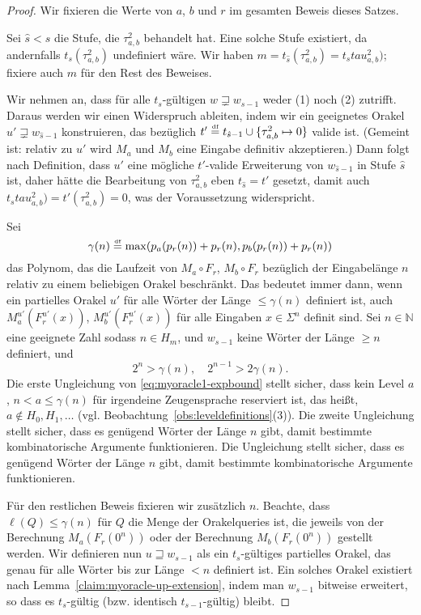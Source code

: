 \begin{proof}
Wir fixieren die Werte von $a$, $b$ und $r$ im gesamten Beweis dieses Satzes.

Sei $\hat{s} < s$ die Stufe, die $\tau^2_{a,b}$ behandelt hat.
Eine solche Stufe existiert, da andernfalls $t_{s}(\tau^2_{a,b})$ undefiniert wäre.
Wir haben $m = t_{\hat{s}}(\tau^2_{a,b}) = t_{s}tau^2_{a,b})$; fixiere auch $m$ für den Rest des Beweises.

Wir nehmen an, dass für alle $t_{s}$-gültigen $w\sqsupsetneq w_{s-1}$ weder (1) noch (2) zutrifft.
Daraus werden wir einen Widerspruch ableiten, indem wir ein geeignetes Orakel $u'\sqsupsetneq w_{\hat{s}-1}$ konstruieren, das bezüglich $t' \stackrel{\text{\smash{\tiny df}}}{=}  t_{\hat{s}-1}\cup \{\tau^2_{a,b}\mapsto 0\}$ valide ist. (Gemeint ist: relativ zu $u'$ wird $M_a$ und $M_b$ eine Eingabe definitiv akzeptieren.)
Dann folgt nach Definition, dass $u'$ eine mögliche $t'$-valide Erweiterung von $w_{\hat{s}-1}$ in Stufe $\hat{s}$ ist, daher hätte die Bearbeitung von $\tau^2_{a,b}$ eben $t_{\hat{s}}=t'$ gesetzt, damit auch $t_{s}tau^2_{a,b})=t'(\tau^2_{a,b})=0$, was der Voraussetzung widerspricht.

Sei
\begin{equation*} \gamma(n) \stackrel{\text{\smash{\tiny df}}}{=}  \max(p_a(p_r(n))+p_r(n), p_b(p_r(n))+p_r(n)) \end{equation*}
das Polynom, das die Laufzeit von $M_a\circ F_r$, $M_b\circ F_r$ bezüglich der Eingabelänge $n$ relativ zu einem beliebigen Orakel beschränkt.
Das bedeutet immer dann, wenn ein partielles Orakel $u'$ für alle Wörter der Länge $\leq \gamma(n)$ definiert ist, auch $M_a^{u'}(F_r^{u'}(x))$, $M_b^{u'}(F_r^{u'}(x))$ für alle Eingaben $x\in\Sigma^n$ definit sind.
Sei $n\in\mathbb N$ eine geeignete Zahl sodass $n\in H_m$, und $w_{s-1}$ keine Wörter der Länge $\geq n$ definiert,
und
\begin{equation}\label{eq:myoracle1-expbound}
    2^n > \gamma(n),\quad  2^{n-1} > 2\gamma(n).
\end{equation}
Die erste Ungleichung von \eqref{eq:myoracle1-expbound} stellt sicher, dass kein Level $a$, $n<a\leq \gamma(n)$ für irgendeine Zeugensprache reserviert ist, das heißt, $a\not\in H_0, H_1, \dots$ (vgl. Beobachtung~\ref{obs:leveldefinitions}(3)). Die zweite Ungleichung stellt sicher, dass es genügend Wörter der Länge $n$ gibt, damit bestimmte kombinatorische Argumente funktionieren.
Die Ungleichung stellt sicher, dass es genügend Wörter der Länge $n$ gibt, damit bestimmte kombinatorische Argumente funktionieren.

Für den restlichen Beweis fixieren wir zusätzlich $n$.
Beachte, dass $\ell(Q)\leq\gamma(n)$ für $Q$ die Menge der Orakelqueries ist, die jeweils von der Berechnung $M_a(F_r(0^n))$ oder der Berechnung $M_b(F_r(0^n))$ gestellt werden.
Wir definieren nun $u\sqsupseteq w_{s-1}$ als ein $t_{s}$-gültiges partielles Orakel, das genau für alle Wörter bis zur Länge $<n$ definiert ist. Ein solches Orakel existiert nach Lemma~\ref{claim:myoracle-up-extension}, indem man $w_{s-1}$ bitweise erweitert, so dass es $t_{s}$-gültig (bzw. identisch $t_{s-1}$-gültig) bleibt.


\end{proof}
